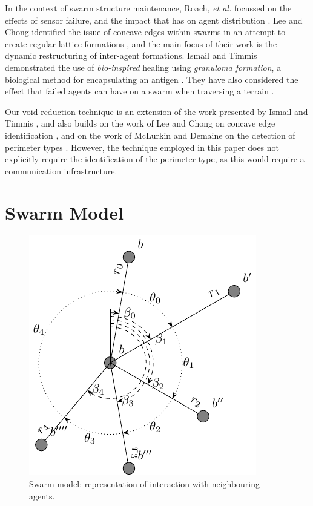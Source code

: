 \documentclass[letterpaper]{article}
\begin{document}
In the context of swarm structure maintenance, Roach, {\it et al.} focussed on the effects of sensor failure, and the impact that has on agent distribution \cite{RMT:15}. Lee and Chong identified the issue of concave edges within swarms in an attempt to create regular lattice formations \cite{GN:08}, and the main focus of their work is the dynamic restructuring of inter-agent formations. Ismail and Timmis demonstrated the use of  \textit{bio-inspired} healing using \textit{granuloma formation}, a biological method for encapsulating an antigen \cite{IT:10}. They have also considered the effect that failed agents can have on a swarm when traversing a terrain \cite{TIBW:16}. 

Our void reduction technique is an extension of the work presented by Ismail and Timmis \cite{IT:10,TIBW:16}, and also builds on the work of Lee and Chong on concave edge identification \cite{GN:08}, and on the work of McLurkin and Demaine on the detection of perimeter types \cite{MD:09}. However, the technique employed in this paper does not explicitly require the identification of the perimeter type, as this would require a communication infrastructure.

\section{Swarm Model}
\label{sec:SwarmModel}

\begin{figure}
\begin{center}
\includegraphics{figures/neighbours}
\end{center}
\caption{Swarm model: representation of interaction with neighbouring agents.  \label{define:neighbours}}
\end{figure}
\end{document}
